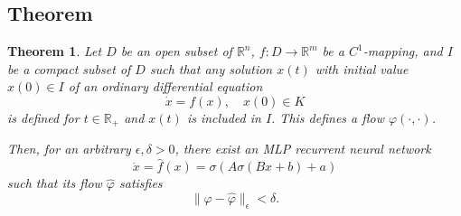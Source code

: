 \documentclass{article}
\newtheorem{theorem}{Theorem}
\theoremstyle{definition}
\theoremstyle{remark}
\newcommand{\reals}{\mathbb{R}}
\begin{document}
\subsection{Theorem}
\begin{theorem}
Let $D$ be an open subset of $\mathbb{R}^n$, $f\colon D \to \mathbb{R}^m$ be a $C^1$-mapping, and $I$ be a compact subset of $D$ such that any solution $x(t)$ with initial value $x(0) \in I$ of an ordinary differential equation
\begin{equation}\label{eq:5}
    \dot{x} = f(x), \quad x(0) \in K
\end{equation}
is defined for $t\in\reals_{+}$ and $x(t)$ is included in $I$.
This defines a flow $\varphi(\cdot, \cdot)$.


 Then, for an arbitrary $\epsilon, \delta > 0$, there exist an MLP recurrent neural network 
 \begin{equation}
\dot x = \hat f(x) = \sigma(A\sigma(Bx+b)+a)
\end{equation}
such that its flow $\hat \varphi$ satisfies
\begin{equation}
\|\varphi-\hat \varphi\|_\epsilon < \delta.
\end{equation}
\end{theorem}
\end{document}
